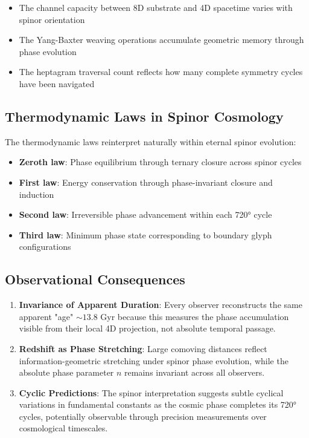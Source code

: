 \documentclass[pdflatex,sn-mathphys-num]{sn-jnl}
\theoremstyle{thmstyleone}
\theoremstyle{thmstyletwo}
\theoremstyle{thmstylethree}
\begin{document}
\begin{appendices}
\begin{itemize}
\item The channel capacity between 8D substrate and 4D spacetime varies with spinor orientation
\item The Yang-Baxter weaving operations accumulate geometric memory through phase evolution
\item The heptagram traversal count reflects how many complete symmetry cycles have been navigated
\end{itemize}

\subsection{Thermodynamic Laws in Spinor Cosmology}

The thermodynamic laws reinterpret naturally within eternal spinor evolution:

\begin{itemize}
\item \textbf{Zeroth law}: Phase equilibrium through ternary closure across spinor cycles
\item \textbf{First law}: Energy conservation through phase-invariant closure and induction  
\item \textbf{Second law}: Irreversible phase advancement within each 720° cycle
\item \textbf{Third law}: Minimum phase state corresponding to boundary glyph configurations
\end{itemize}

\subsection{Observational Consequences}

\begin{enumerate}
\item \textbf{Invariance of Apparent Duration}: Every observer reconstructs the same apparent "age" $\sim 13.8$ Gyr because this measures the phase accumulation visible from their local 4D projection, not absolute temporal passage.

\item \textbf{Redshift as Phase Stretching}: Large comoving distances reflect information-geometric stretching under spinor phase evolution, while the absolute phase parameter $n$ remains invariant across all observers.

\item \textbf{Cyclic Predictions}: The spinor interpretation suggests subtle cyclical variations in fundamental constants as the cosmic phase completes its 720° cycles, potentially observable through precision measurements over cosmological timescales.
\end{enumerate}


\end{appendices}
\end{document}
